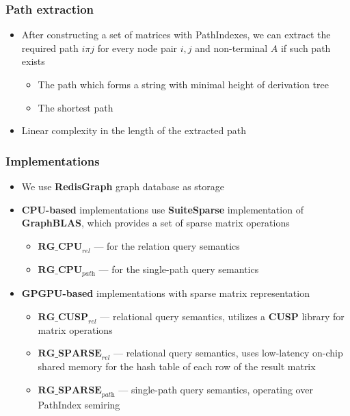 \documentclass[xcolor=table]{beamer}
\begin{document}
\begin{frame}[fragile] \frametitle{Path extraction}

\begin{itemize}
	\item After constructing a set of matrices with PathIndexes, we can extract the
	required path $i\pi j$ for every node pair $i, j$ and non-terminal $A$ if such path exists
	\pause
	\begin{itemize}
		\item The path which forms a string with minimal height of derivation tree
		\pause
		\item The shortest path
	\end{itemize}
    \pause
	\item Linear complexity in the length of the extracted path
\end{itemize}
\end{frame}


\begin{frame}[fragile] \frametitle{Implementations}

\begin{itemize}
	\item We use \textbf{RedisGraph} graph database as storage
	\pause
	\item \textbf{CPU-based} implementations use \textbf{SuiteSparse} implementation
	of \textbf{GraphBLAS}, which provides a set of sparse matrix operations
	\begin{itemize}
		\item $\textbf{RG\_CPU}_{\textit{rel}}$ --- for the relation query semantics
		\pause
		\item $\textbf{RG\_CPU}_{\textit{path}}$ --- for the single-path query semantics
	\end{itemize}
	\pause
	\item \textbf{GPGPU-based} implementations with sparse matrix representation
	\begin{itemize}
		\item $\textbf{RG\_CUSP}_{\textit{rel}}$ --- relational query semantics, utilizes a \textbf{CUSP} library for matrix operations
		\pause
		\item $\textbf{RG\_SPARSE}_{\textit{rel}}$ --- relational query semantics, uses low-latency on-chip shared memory for the hash table of each row of the result matrix
		\pause
		\item $\textbf{RG\_SPARSE}_{\textit{path}}$ --- single-path query semantics, operating over PathIndex semiring
	\end{itemize}
\end{itemize}
\end{frame}
\end{document}
